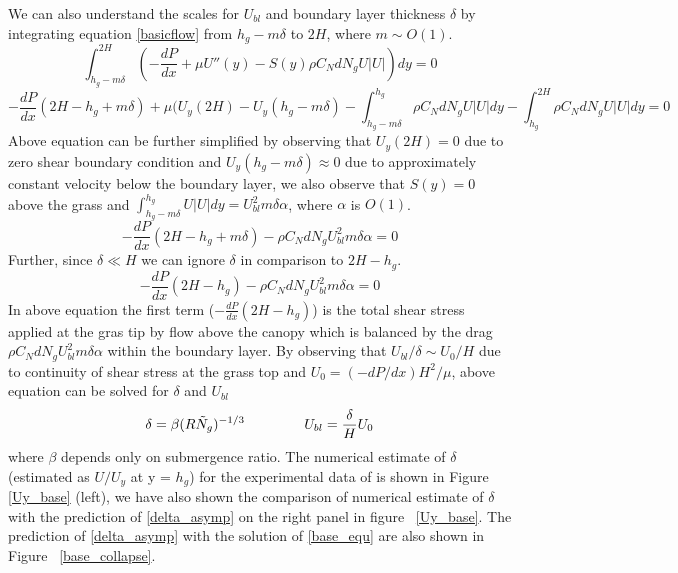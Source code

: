 \documentclass[12pt]{report}   %
\newcommand{\Ndg}{\tilde{N}_g}
\begin{document}
We can also understand the scales for $U_{bl}$ and boundary layer thickness $\delta$ by integrating equation \eqref{basicflow} from $h_g-m\delta$ to $2H$, where $m \sim O(1)$.
\begin{equation}
 \int_{h_g-m\delta}^{2H} \left( -\frac{dP}{dx}+\mu U''(y) -S(y) \rho C_N d N_gU |U|\right)dy = 0 
\end{equation}
\begin{equation*}
-\frac{dP}{dx}(2H-h_g+m\delta)+\mu (U_y(2H)-U_y(h_g-m\delta) -\int_{h_g-m\delta}^{h_g} \rho C_N d N_gU |U|dy -\int_{h_g}^{2H} \rho C_N d N_gU |U|dy =0
\end{equation*}
Above equation can be further simplified by observing that $U_y(2H)=0$ due to zero shear boundary condition and $U_y(h_g-m\delta) \approx 0$ due to approximately constant velocity below the boundary layer, we also observe that $S(y)=0$ above the grass and $\int_{h_g-m\delta}^{h_g} U |U| dy = U_{bl}^2 m\delta \alpha$, where $\alpha$ is $O(1)$.
\begin{equation*}
-\frac{dP}{dx}(2H-h_g+m\delta) - \rho C_N d N_g U_{bl}^2 m \delta \alpha  =0
\end{equation*}
Further, since $\delta \ll H$ we can ignore $\delta$ in comparison to $2H-h_g$.
\begin{equation}
-\frac{dP}{dx}(2H-h_g) - \rho C_N d N_g U_{bl}^2 m \delta \alpha  =0
\end{equation}
In above equation the first term ($ -\frac{dP}{dx}(2H-h_g)$) is the total shear stress applied at the gras tip by flow above the canopy which is balanced by the drag $\rho C_N d N_g U_{bl}^2 m \delta \alpha $ within the boundary layer. By observing that $ U_{bl}/\delta \sim U_0/H$ due to continuity of shear stress at the grass top and $U_0 = (-dP/dx) H^2/\mu$, above equation can be solved for $\delta$ and $U_{bl}$
\begin{equation}
 \delta = \beta (R\Ndg)^{-1/3} \hspace{1.5cm} U_{bl} = \frac{\delta}{H} U_0 
 \label{delta_asymp}
\end{equation}
where $\beta$ depends only on submergence ratio. The numerical estimate of $\delta$ (estimated as $U/U_y$ at y = $h_g$) for the experimental data of \cite{Nepf04} is shown in Figure \ref{Uy_base} (left), we have also shown the comparison of numerical estimate of $\delta$ with the prediction of \eqref{delta_asymp} on the right panel in figure ~\ref{Uy_base}.
The prediction of \eqref{delta_asymp} with the solution of \eqref{base_equ} are also shown in Figure ~\ref{base_collapse}. 
\end{document}
